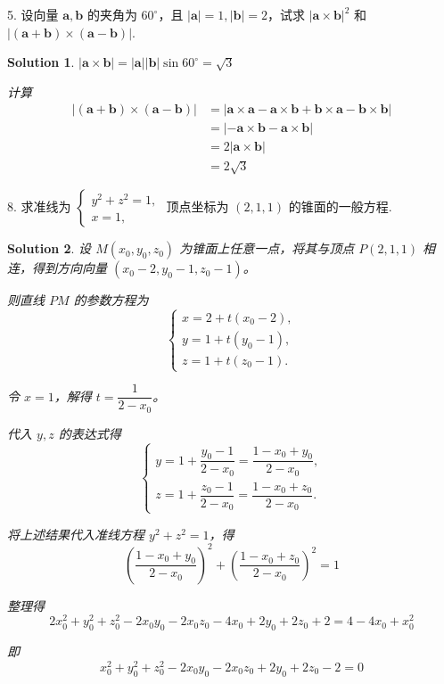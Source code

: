\documentclass[a4paper,12pt]{article}
\newtheorem*{sol}{Solution}
\begin{document}
5. 设向量 $\boldsymbol{a},\boldsymbol{b}$ 的夹角为 $60^\circ$，且 $|\boldsymbol{a}|=1,|\boldsymbol{b}|=2$，试求 $|\boldsymbol{a} \times \boldsymbol{b}|^2$ 和 $|(\boldsymbol{a}+\boldsymbol{b}) \times (\boldsymbol{a}-\boldsymbol{b})|$.

\begin{sol}
    $|\boldsymbol{a} \times \boldsymbol{b}| = |\boldsymbol{a}||\boldsymbol{b}|\sin 60^\circ = \sqrt{3}$

    计算
    $$\begin{aligned}
            |(\boldsymbol{a}+\boldsymbol{b}) \times (\boldsymbol{a}-\boldsymbol{b})|
             & = |\boldsymbol{a} \times \boldsymbol{a} - \boldsymbol{a} \times \boldsymbol{b} + \boldsymbol{b} \times \boldsymbol{a} - \boldsymbol{b} \times \boldsymbol{b}| \\
             & = |-\boldsymbol{a} \times \boldsymbol{b} - \boldsymbol{a} \times \boldsymbol{b}|                                                                              \\
             & = 2|\boldsymbol{a} \times \boldsymbol{b}|                                                                                                                     \\
             & = 2\sqrt{3}
        \end{aligned}$$
\end{sol}

8. 求准线为 $\begin{cases} y^2 + z^2 = 1, \\ x = 1, \end{cases}$ 顶点坐标为 $(2,1,1)$ 的锥面的一般方程.

\begin{sol}
    设 $M(x_0, y_0, z_0)$ 为锥面上任意一点，将其与顶点 $P(2, 1, 1)$ 相连，得到方向向量 $(x_0 - 2, y_0 - 1, z_0 - 1)$。

    则直线 $PM$ 的参数方程为
    $$\begin{cases}
            x = 2 + t(x_0 - 2), \\
            y = 1 + t(y_0 - 1), \\
            z = 1 + t(z_0 - 1).
        \end{cases}$$

    令 $x = 1$，解得 $t = \dfrac{1}{2 - x_0}$。

    代入 $y, z$ 的表达式得
    $$\begin{cases}
            y = 1 + \dfrac{y_0 - 1}{2 - x_0} = \dfrac{1 - x_0 + y_0}{2 - x_0}, \\[1em]
            z = 1 + \dfrac{z_0 - 1}{2 - x_0} = \dfrac{1 - x_0 + z_0}{2 - x_0}.
        \end{cases}$$

    将上述结果代入准线方程 $y^2 + z^2 = 1$，得
    $$\left(\frac{1 - x_0 + y_0}{2 - x_0}\right)^2 + \left(\frac{1 - x_0 + z_0}{2 - x_0}\right)^2 = 1$$

    整理得
    $$2x_0^2 + y_0^2 + z_0^2 - 2x_0y_0 - 2x_0z_0 - 4x_0 + 2y_0 + 2z_0 + 2 = 4 - 4x_0 + x_0^2$$

    即
    $$x_0^2 + y_0^2 + z_0^2 - 2x_0y_0 - 2x_0z_0 + 2y_0 + 2z_0 - 2 = 0$$
\end{sol}
\end{document}
